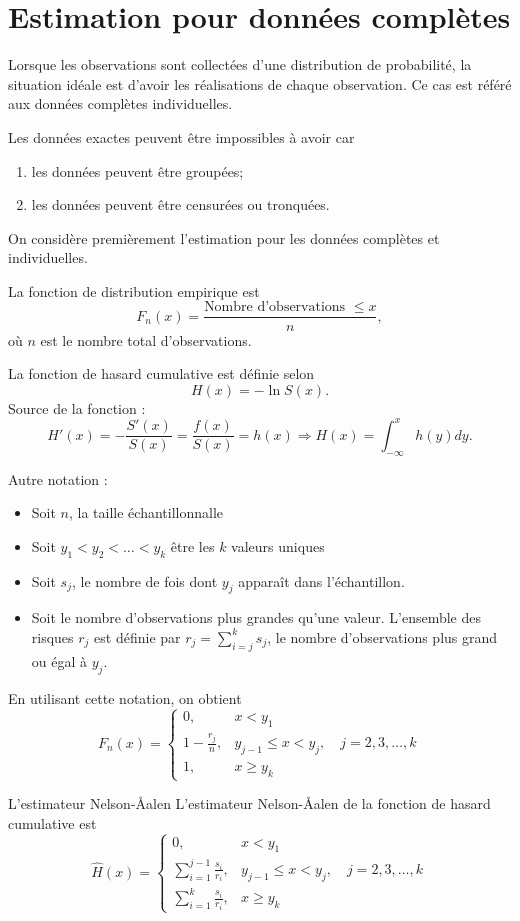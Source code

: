 \chapter{Estimation pour données complètes}

Lorsque les observations sont collectées d'une distribution de probabilité, la situation idéale est d'avoir les réalisations de chaque observation. Ce cas est référé aux données complètes individuelles. 

Les données exactes peuvent être impossibles à avoir car
\begin{enumerate}
	\item les données peuvent être groupées;
	\item les données peuvent être censurées ou tronquées. 
\end{enumerate}

On considère premièrement l'estimation pour les données complètes et individuelles. 

\begin{definition}{}{}
	La fonction de distribution empirique est 
	$$F_n(x) = \frac{\text{Nombre d'observations }\leq x}{n},$$
	où $n$ est le nombre total d'observations. 
\end{definition}

\begin{definition}{}{}
	La fonction de hasard cumulative est définie selon 
	$$H(x) = -\ln S(x).$$
	\tcblower
	Source de la fonction : 
	$$H'(x) = -\frac{S'(x)}{S(x)} = \frac{f(x)}{S(x)} = h(x) \Rightarrow H(x) = \int_{-\infty}^{x} h(y) dy.$$
\end{definition}

Autre notation : 

\begin{itemize}
	\item Soit $n$, la taille échantillonnalle
	\item Soit $y_1<y_2<\dots<y_k$ être les $k$ valeurs uniques
	\item Soit $s_j$, le nombre de fois dont $y_j$ apparaît dans l'échantillon. 
	\item Soit le nombre d'observations plus grandes qu'une valeur. L'ensemble des risques $r_j$ est définie par $r_j = \sum_{i = j}^{k}s_j$, le nombre d'observations plus grand ou égal à $y_j$.
\end{itemize}
En utilisant cette notation, on obtient
$$F_n(x) = \begin{cases}
0,&x<y_1\\
1-\frac{r_j}{n}, & y_{j-1}\leq x < y_j,\quad j = 2, 3, \dots, k\\
1,& x\geq y_k
\end{cases}$$

\begin{definition}{L'estimateur Nelson-\AA{}alen}{}
	L'estimateur Nelson-\AA{}alen de la fonction de hasard cumulative est 
	$$\hat{H}(x) = \begin{cases}
	0,&x<y_1\\
	\sum_{i = 1}^{j-1} \frac{s_i}{r_i}, & y_{j-1}\leq x < y_j,\quad j = 2, 3, \dots, k\\
	\sum_{i = 1}^{k} \frac{s_i}{r_i},& x\geq y_k
	\end{cases}$$
\end{definition}